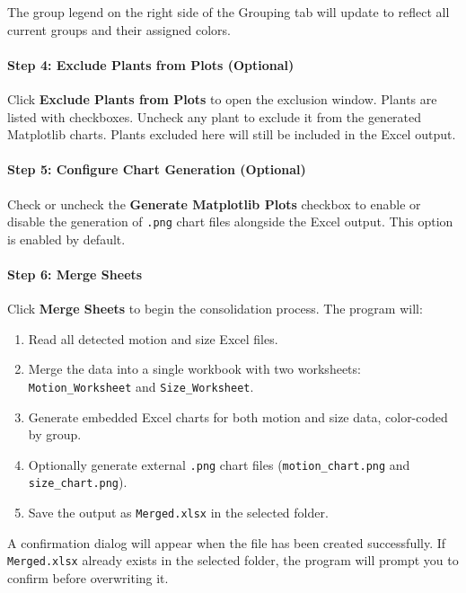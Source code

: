\documentclass[12pt,a4paper,oneside]{report}
\begin{document}
The group legend on the right side of the Grouping tab will update to reflect all current groups and their assigned colors.

\paragraph{Step 4: Exclude Plants from Plots (Optional)}

Click \textbf{Exclude Plants from Plots} to open the exclusion window. Plants are listed with checkboxes. Uncheck any plant to exclude it from the generated Matplotlib charts. Plants excluded here will still be included in the Excel output.

\paragraph{Step 5: Configure Chart Generation (Optional)}

Check or uncheck the \textbf{Generate Matplotlib Plots} checkbox to enable or disable the generation of \texttt{.png} chart files alongside the Excel output. This option is enabled by default.

\paragraph{Step 6: Merge Sheets}

Click \textbf{Merge Sheets} to begin the consolidation process. The program will:

\begin{enumerate}
    \item Read all detected motion and size Excel files.
    \item Merge the data into a single workbook with two worksheets: \texttt{Motion\_Worksheet} and \texttt{Size\_Worksheet}.
    \item Generate embedded Excel charts for both motion and size data, color-coded by group.
    \item Optionally generate external \texttt{.png} chart files (\texttt{motion\_chart.png} and \texttt{size\_chart.png}).
    \item Save the output as \texttt{Merged.xlsx} in the selected folder.
\end{enumerate}

A confirmation dialog will appear when the file has been created successfully. If \texttt{Merged.xlsx} already exists in the selected folder, the program will prompt you to confirm before overwriting it.
\end{document}
